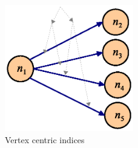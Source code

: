 \begin{figure}[h]
    \centering
    \includegraphics[width=0.5\textwidth]{figs/vertex-centric-indices.eps}
    \caption{Vertex centric indices}
    \label{fig:vertex-centric-indices}
\end{figure}
